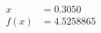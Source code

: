 \documentclass[preview]{standalone}
\begin{document}
\begin{align*}
x &= 0.3050\\f(x) &= 4.5258865
\end{align*}
\end{document}
